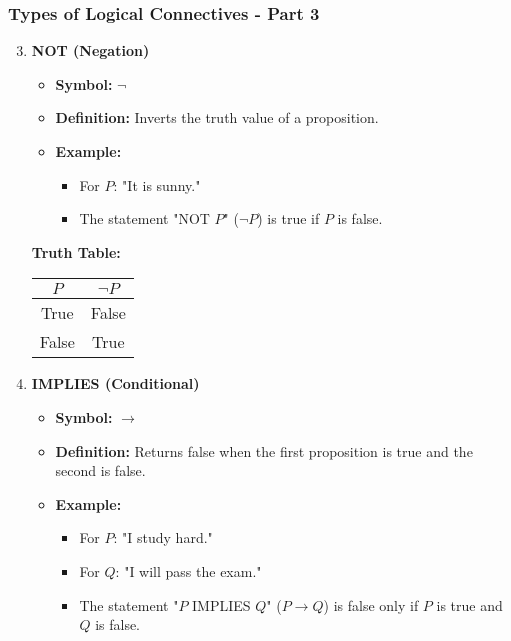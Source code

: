 \documentclass[aspectratio=169]{beamer}
\begin{document}
\begin{frame}[fragile]
    \frametitle{Types of Logical Connectives - Part 3}
    \begin{enumerate}
        \setcounter{enumi}{2} %
        \item \textbf{NOT (Negation)} 
            \begin{itemize}
                \item \textbf{Symbol:} $\neg$
                \item \textbf{Definition:} Inverts the truth value of a proposition.
                \item \textbf{Example:}
                \begin{itemize}
                    \item For $P$: "It is sunny."
                    \item The statement "NOT $P$" ($\neg P$) is true if $P$ is false.
                \end{itemize}
            \end{itemize}
            \textbf{Truth Table:}
            \begin{tabular}{|c|c|}
                \hline
                $P$ & $\neg P$ \\
                \hline
                True  & False \\
                False & True  \\
                \hline
            \end{tabular}
        \item \textbf{IMPLIES (Conditional)}
            \begin{itemize}
                \item \textbf{Symbol:} $\rightarrow$
                \item \textbf{Definition:} Returns false when the first proposition is true and the second is false.
                \item \textbf{Example:}
                \begin{itemize}
                    \item For $P$: "I study hard."
                    \item For $Q$: "I will pass the exam."
                    \item The statement "$P$ IMPLIES $Q$" ($P \rightarrow Q$) is false only if $P$ is true and $Q$ is false.
                \end{itemize}

\end{itemize}
\end{enumerate}
\end{frame}
\end{document}
